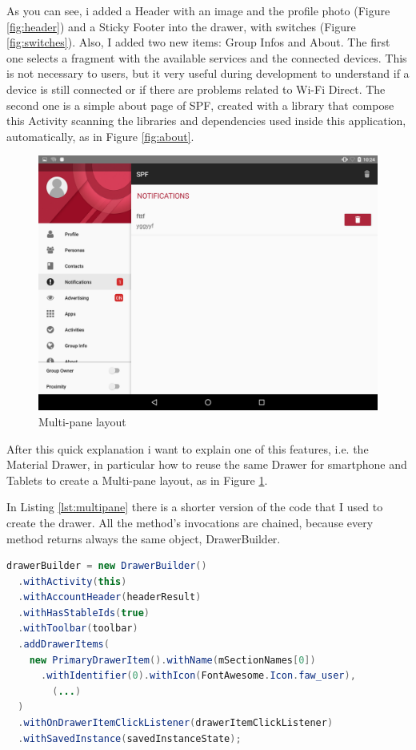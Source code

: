 As you can see, i added a Header with an image and the profile photo (Figure \ref{fig:header}) and a Sticky Footer into the drawer, with switches (Figure \ref{fig:switches}). Also, I added two new items: Group Infos and About. The first one selects a fragment with the available services and the connected devices. This is not necessary to users, but it very useful during development to understand if a device is still connected or if there are problems related to Wi-Fi Direct. The second one is a simple about page of SPF, created with a library that compose this Activity scanning the libraries and dependencies used inside this application, automatically, as in Figure \ref{fig:about}.

\begin{figure}[thpb]
	\centering
	\includegraphics[scale=0.15]{./images/chap3/tablet1.png}
	\caption{Multi-pane layout}
	\label{fig:tablet1}
\end{figure}	


After this quick explanation i want to explain one of this features, i.e. the Material Drawer, in particular how to reuse the same Drawer for smartphone and Tablets to create a Multi-pane layout, as in Figure \ref{fig:tablet1}.

In Listing \ref{lst:multipane} there is a shorter version of the code that I used to create the drawer. All the method's invocations are chained, because every method returns always the same object, DrawerBuilder.


\begin{lstlisting}[caption={DrawerBuilder creations},label=lst:drawerbuilder, language=Java]
drawerBuilder = new DrawerBuilder()
  .withActivity(this)
  .withAccountHeader(headerResult)
  .withHasStableIds(true)
  .withToolbar(toolbar)
  .addDrawerItems(
    new PrimaryDrawerItem().withName(mSectionNames[0])
      .withIdentifier(0).withIcon(FontAwesome.Icon.faw_user),
    	(...)
  )
  .withOnDrawerItemClickListener(drawerItemClickListener)
  .withSavedInstance(savedInstanceState);
\end{lstlisting}


